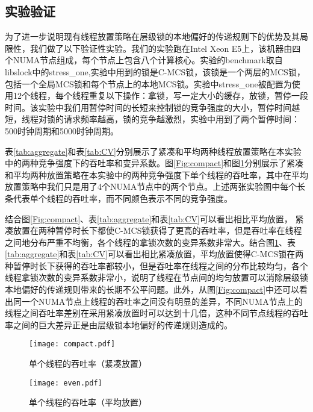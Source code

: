 \subsection{实验验证}
为了进一步说明现有线程放置策略在层级锁的本地偏好的传递规则下的优势及其局限性，我们做了以下验证性实验。我们的实验跑在Intel Xeon E5上，该机器由四个NUMA节点组成，每个节点上包含八个计算核心。实验的benchmark取自libslock中的stress\_one,实验中用到的锁是C-MCS锁，该锁是一个两层的MCS锁，包括一个全局MCS锁和每个节点上的本地MCS锁。实验中stress\_one被配置为使用12个线程，每个线程重复以下操作：拿锁，写一定大小的缓存，放锁，暂停一段时间。该实验中我们用暂停时间的长短来控制锁的竞争强度的大小，暂停时间越短，线程对锁的请求频率越高，锁的竞争越激烈，实验中用到了两个暂停时间：500时钟周期和5000时钟周期。

表\ref{tab:aggregate}和表\ref{tab:CV}分别展示了紧凑和平均两种线程放置策略在本实验中的两种竞争强度下的吞吐率和变异系数。图\ref{Fig:compact}和图\ref{Fig:even}分别展示了紧凑和平均两种放置策略在本实验中的两种竞争强度下单个线程的吞吐率，其中在平均放置策略中我们只是用了4个NUMA节点中的两个节点。上述两张实验图中每个长条代表单个线程的吞吐率，而不同颜色表示不同的竞争强度。


结合图\ref{Fig:compact}、表\ref{tab:aggregate}和表\ref{tab:CV}可以看出相比平均放置，
紧凑放置在两种暂停时长下都使C-MCS锁获得了更高的吞吐率，但是吞吐率在线程之间地分布严重不均衡，各个线程的拿锁次数的变异系数非常大。结合图\ref{Fig:even}、表\ref{tab:aggregate}和表\ref{tab:CV}可以看出相比紧凑放置，平均放置使得C-MCS锁在两种暂停时长下获得的吞吐率都较小，但是吞吐率在线程之间的分布比较均匀，各个线程拿锁次数的变异系数非常小，说明了线程在节点间的均匀放置可以消除层级锁本地偏好的传递规则带来的长期不公平问题。此外，从图\ref{Fig:compact}中还可以看出同一个NUMA节点上线程的吞吐率之间没有明显的差异，不同NUMA节点上的线程之间吞吐率差别在采用紧凑放置时可以达到十几倍，这种不同节点线程的吞吐率之间的巨大差异正是由层级锁本地偏好的传递规则造成的。

\begin{figure}[htbp]
\centering
\begin{minipage}[t]{0.48\textwidth}
\centering
\texttt{[image: compact.pdf]}
\caption{单个线程的吞吐率（紧凑放置）}
	\label{Fig:compact}
\end{minipage}
\begin{minipage}[t]{0.48\textwidth}
\centering
	\texttt{[image: even.pdf]}
	\caption{单个线程的吞吐率（平均放置）}
	\label{Fig:even}
\end{minipage}
\end{figure}

